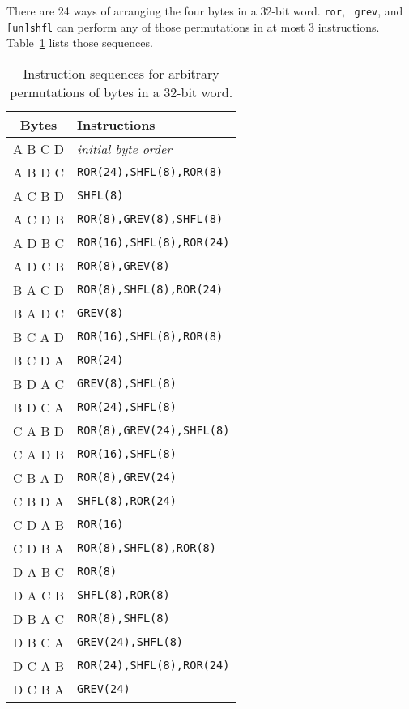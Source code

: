 There are 24 ways of arranging the four bytes in a 32-bit word. {\tt ror}, {\tt
grev}, and {\tt [un]shfl} can perform any of those permutations in at most 3
instructions. Table~\ref{permbytes} lists those sequences.~\cite{Wolf19A}

\begin{table}[h!]
\begin{center}
\begin{tabular}{c|l}
Bytes & Instructions \\
\hline
A B C D & {\it initial byte order} \\
A B D C & {\tt ROR(24),SHFL(8),ROR(8)} \\
A C B D & {\tt SHFL(8)} \\
A C D B & {\tt ROR(8),GREV(8),SHFL(8)} \\
A D B C & {\tt ROR(16),SHFL(8),ROR(24)} \\
A D C B & {\tt ROR(8),GREV(8)} \\
\hline
B A C D & {\tt ROR(8),SHFL(8),ROR(24)} \\
B A D C & {\tt GREV(8)} \\
B C A D & {\tt ROR(16),SHFL(8),ROR(8)} \\
B C D A & {\tt ROR(24)} \\
B D A C & {\tt GREV(8),SHFL(8)} \\
B D C A & {\tt ROR(24),SHFL(8)} \\
\hline
C A B D & {\tt ROR(8),GREV(24),SHFL(8)} \\
C A D B & {\tt ROR(16),SHFL(8)} \\
C B A D & {\tt ROR(8),GREV(24)} \\
C B D A & {\tt SHFL(8),ROR(24)} \\
C D A B & {\tt ROR(16)} \\
C D B A & {\tt ROR(8),SHFL(8),ROR(8)} \\
\hline
D A B C & {\tt ROR(8)} \\
D A C B & {\tt SHFL(8),ROR(8)} \\
D B A C & {\tt ROR(8),SHFL(8)} \\
D B C A & {\tt GREV(24),SHFL(8)} \\
D C A B & {\tt ROR(24),SHFL(8),ROR(24)} \\
D C B A & {\tt GREV(24)} \\
\end{tabular}
\end{center}
\caption{Instruction sequences for arbitrary permutations of bytes in a 32-bit word.}
\label{permbytes}
\end{table}

